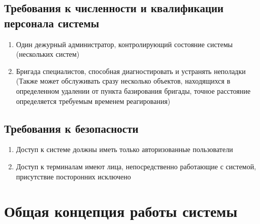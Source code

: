 \subsection{Требования к численности и квалификации персонала системы}
\begin{enumerate}
	\itemsep0em 
	\item Один дежурный администратор, контролирующий состояние системы (нескольких систем)
	\item Бригада специалистов, способная диагностировать и устранять неполадки (Также может обслуживать сразу несколько объектов, находящихся в определенном удалении от пункта базирования бригады, точное расстояние определяется требуемым временем реагирования)
	\end{enumerate}
\subsection{Требования к безопасности}
\begin{enumerate}
	\itemsep0em 
	\item Доступ к системе должны иметь только авторизованные пользователи
	\item Доступ к терминалам имеют лица, непосредственно работающие с системой, присутствие посторонних исключено
\end{enumerate}
\newpage\section{Общая концепция работы системы}



\newpage{}